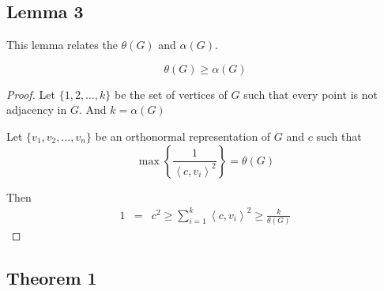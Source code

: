 \documentclass{beamer}
\begin{document}
            \subsection{Lemma 3}

                  \begin{frame}
                        This lemma relates the $\theta(G)$ and $\alpha(G)$.

                        \begin{lemma}
                              \begin{equation}
                                    \theta(G) \geq \alpha(G)
                              \end{equation}
                        \end{lemma}

                        \pause

                        \begin{proof}
                              Let $ \{1,2,\dots,k\} $ be the set of vertices of $ G $ such that every point is not adjacency in $ G $. And $ k = \alpha(G) $
                  
                              Let $ \{v_1, v_2, \dots, v_n\} $ be an orthonormal representation of $ G $ and $ c $ such that
                              \begin{equation}
                                    \max \left\{ \frac{1}{\left<c,v_{i}\right>^2} \right\} = \theta(G)
                              \end{equation}
                                    
                              Then
                              \begin{eqnarray}
                                    1 &=& c^{2}
                                    \geq \sum_{i=1}^{k} \left<c,v_{i}\right>^{2}
                                    \geq \frac{k}{\theta(G)}
                              \end{eqnarray}
                        \end{proof}
                  \end{frame}

            \subsection{Theorem 1}
                  
\end{document}
